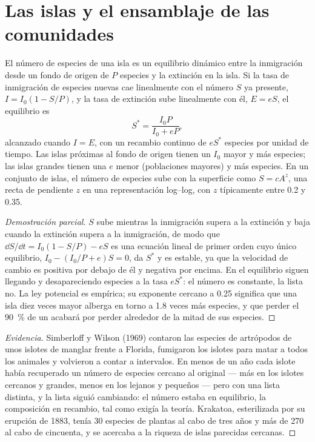 \section{Las islas y el ensamblaje de las comunidades}

\begin{theorem}\label{thm:b1:ecosystem-dynamics:island}
El número de especies de una isla es un equilibrio dinámico entre la
inmigración desde un fondo de origen de $P$ especies y la extinción en la
isla. Si la tasa de inmigración de especies nuevas cae linealmente con el
número $S$ ya presente, $I = I_0(1 - S/P)$, y la tasa de extinción sube
linealmente con él, $E = eS$, el equilibrio es
\[
S^* = \frac{I_0 P}{I_0 + eP} ,
\]
alcanzado cuando $I = E$, con un recambio continuo de $eS^*$ especies por
unidad de tiempo. Las islas próximas al fondo de origen tienen un $I_0$
mayor y más especies; las islas grandes tienen una $e$ menor (poblaciones
mayores) y más especies. En un conjunto de islas, el número de especies sube
con la superficie como $S = cA^z$, una recta de pendiente $z$ en una
representación log--log, con $z$ típicamente entre \num{0.2} y \num{0.35}.
\end{theorem}
\begin{proof}[Demostración parcial]
$S$ sube mientras la inmigración supera a la extinción y baja cuando la
extinción supera a la inmigración, de modo que $\dd S/\dd t = I_0(1 - S/P) - eS$
es una ecuación lineal de primer orden cuyo único equilibrio, $I_0 -
(I_0/P + e)S = 0$, da $S^*$ y es estable, ya que la velocidad de cambio es
positiva por debajo de él y negativa por encima. En el equilibrio siguen
llegando y desapareciendo especies a la tasa $eS^*$: el número es constante,
la lista no. La ley potencial es empírica; su exponente cercano a
\num{0.25} significa que una isla diez veces mayor alberga en torno a
\num{1.8} veces más especies, y que perder el \qty{90}{\%} de un 
acabará por perder alrededor de la mitad de sus especies.
\end{proof}
\begin{proof}[Evidencia]
Simberloff y Wilson (1969) contaron las especies de artrópodos de unos
islotes de manglar frente a Florida, fumigaron los islotes para matar a
todos los animales y volvieron a contar a intervalos. En menos de un año
cada islote había recuperado un número de especies cercano al original ---
más en los islotes cercanos y grandes, menos en los lejanos y pequeños ---
pero con una lista distinta, y la lista siguió cambiando: el número estaba
en equilibrio, la composición en recambio, tal como exigía la teoría.
Krakatoa, esterilizada por su erupción de 1883, tenía \num{30} especies de
plantas al cabo de tres años y más de \num{270} al cabo de cincuenta, y se
acercaba a la riqueza de islas parecidas cercanas.
\end{proof}

